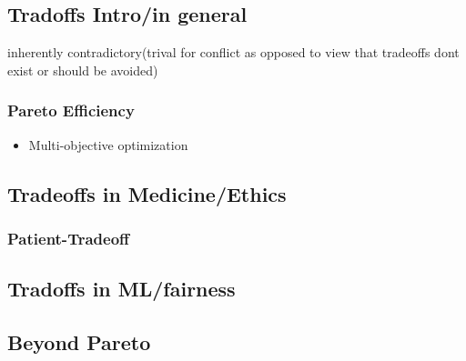 \subsection{Tradoffs Intro/in general}
inherently contradictory(trival for conflict as opposed to view that tradeoffs dont exist or should be avoided)
\subsubsection{Pareto Efficiency}
\begin{itemize}
	\item Multi-objective optimization
\end{itemize}
\subsection{Tradeoffs in Medicine/Ethics}
\subsubsection{Patient-Tradeoff}

\subsection{Tradoffs in ML/fairness}
\subsubsection{}
\subsection{Beyond Pareto}
